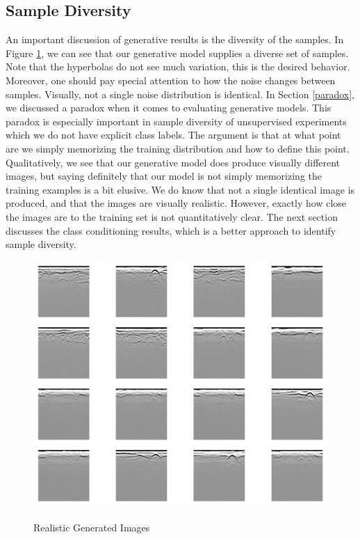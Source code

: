 \subsection{Sample Diversity}\label{sample diversity}
\hspace{0.5in}An important discussion of generative results is the diversity of the samples. In Figure \ref{fig:real_diversity}, we can see that our generative model supplies a diverse set of samples. Note that the hyperbolas do not see much variation, this is the desired behavior. Moreover, one should pay special attention to how the noise changes between samples. Visually, not a single noise distribution is identical. In Section \ref{paradox}, we discussed a paradox when it comes to evaluating generative models. This paradox is especially important in sample diversity of unsupervised experiments which we do not have explicit class labels. The argument is that at what point are we simply memorizing the training distribution and how to define this point. Qualitatively, we see that our generative model does produce visually different images, but saying definitely that our model is not simply memorizing the training examples is a bit elusive. We do know that not a single identical image is produced, and that the images are visually realistic. However, exactly how close the images are to the training set is not quantitatively clear. The next section discusses the class conditioning results, which is a better approach to identify sample diversity. 
\vspace{0.5\baselineskip}

\begin{figure}[H]
    \centering
    \includegraphics[width=\linewidth]{figures/diversity_512.png}
    \caption{\\Realistic Generated Images}
    \label{fig:real_diversity}
\end{figure}


